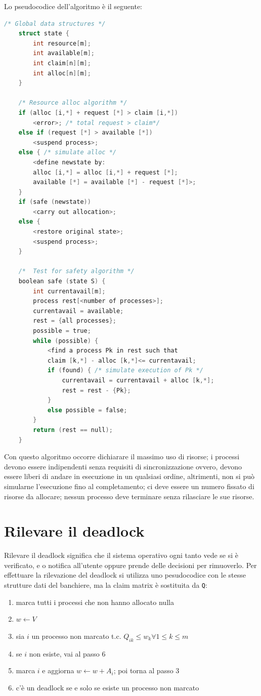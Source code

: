 Lo pseudocodice dell'algoritmo è il seguente:
\begin{lstlisting}[language=C]
    /* Global data structures */
    struct state {
        int resource[m];
        int available[m];
        int claim[n][m];
        int alloc[n][m];
    }

    /* Resource alloc algorithm */
    if (alloc [i,*] + request [*] > claim [i,*])
        <error>; /* total request > claim*/
    else if (request [*] > available [*])
        <suspend process>;
    else { /* simulate alloc */
        <define newstate by:
        alloc [i,*] = alloc [i,*] + request [*];
        available [*] = available [*] - request [*]>;
    }
    if (safe (newstate))
        <carry out allocation>;
    else {
        <restore original state>;
        <suspend process>;
    }

    /*  Test for safety algorithm */
    boolean safe (state S) {
        int currentavail[m];
        process rest[<number of processes>];
        currentavail = available;
        rest = {all processes};
        possible = true;
        while (possible) {
            <find a process Pk in rest such that
            claim [k,*] - alloc [k,*]<= currentavail;
            if (found) { /* simulate execution of Pk */
                currentavail = currentavail + alloc [k,*];
                rest = rest - {Pk};
            }
            else possible = false;
        }
        return (rest == null);
    }
\end{lstlisting}

Con questo algoritmo occorre dichiarare il massimo uso di risorse; i processi devono essere indipendenti senza requisiti di sincronizzazione ovvero, devono essere liberi di andare in esecuzione in un qualsiasi ordine, altrimenti, non si può simularne l'esecuzione fino al completamento; ci deve essere un numero fissato di risorse da allocare; nessun processo deve terminare senza rilasciare le sue risorse.

\section{Rilevare il deadlock}
Rilevare il deadlock significa che il sistema operativo ogni tanto vede se si è verificato, e o notifica all'utente oppure prende delle decisioni per rimuoverlo. Per effettuare la rilevazione del deadlock si utilizza uno pesudocodice con le stesse strutture dati del banchiere, ma la claim matrix è sostituita da \verb|Q|:
\begin{enumerate}
    \item marca tutti i processi che non hanno allocato nulla
    \item $w\leftarrow V$
    \item sia $i$ un processo non marcato t.c. $Q_{ik} \leq w_k \forall 1\leq k\leq m$
    \item se $i$ non esiste, vai al passo 6
    \item marca $i$ e aggiorna $w\leftarrow w + A_i$; poi torna al passo 3
    \item c'è un deadlock se e solo se esiste un processo non marcato
\end{enumerate}

